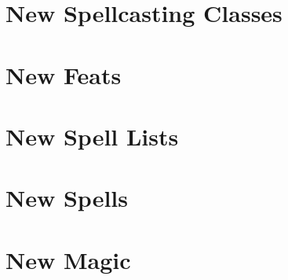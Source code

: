 \section{New Spellcasting Classes}
%
 \newpage
\section{New Feats}
\newpage
\section{New Spell Lists}
\newpage
\section{New Spells}
\newpage
\section{New Magic}
\newpage